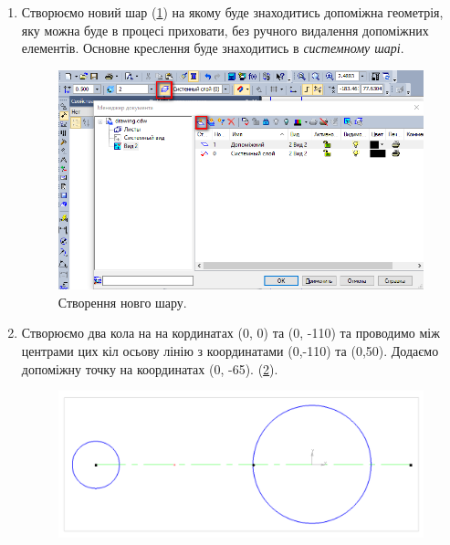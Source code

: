 \begin{enumerate}[leftmargin=*]
\item Створюємо новий шар (\ref{fig:lab4:new_layer}) на якому буде знаходитись допоміжна геометрія,
  яку можна буде в процесі приховати, без ручного видалення допоміжних елементів. Основне креслення
  буде знаходитись в \textit{системному шарі}.
  \begin{figure}[!ht]
    \centering \includegraphics[width=0.9\linewidth]{./images/lab4/create_new_layer.png}
    \caption{Створення новго шару.}
    \label{fig:lab4:new_layer}
  \end{figure}
  \FloatBarrier

\item Створюємо два кола на на кординатах (0, 0) та (0, -110) та проводимо між центрами цих кіл
  осьову лінію з координатами (0,-110) та (0,50). Додаємо допоміжну точку на координатах (0,
  -65). (\ref{fig:lab4:step1}).
  \begin{figure}[!ht]
    \centering \includegraphics[width=0.9\linewidth]{./images/lab4/step1.png}
    \caption{\label{fig:lab4:step1}}
  \end{figure}
  \FloatBarrier


\end{enumerate}
